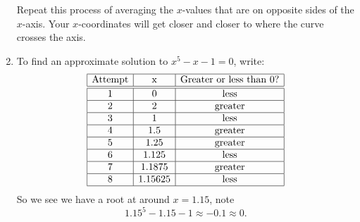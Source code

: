 \documentclass[handout,nooutcomes,noauthor]{ximera}
\begin{document}
\begin{question}
\begin{freeResponse}
\begin{enumerate}
    Repeat this process of averaging the $x$-values that are on
    opposite sides of the $x$-axis. Your $x$-coordinates will get closer
    and closer to where the curve crosses the axis.



    \item To find an approximate  solution to $x^5-x-1=0$, write:
    \[
    \begin{array}{|c|c|c|c|}\hline
      \text{Attempt} & \text{x} & \text{Greater or less than $0$?} \\ \hline\hline
      1 & 0 & \text{less} \\ \hline
      2 & 2 & \text{greater}  \\ \hline
      3 & 1 & \text{less}  \\ \hline
      4 & 1.5 & \text{greater}  \\ \hline
      5 & 1.25 & \text{greater}  \\ \hline
      6 & 1.125 & \text{less}  \\ \hline
      7 & 1.1875 & \text{greater}  \\ \hline
      8 & 1.15625 & \text{less}  \\ \hline
    \end{array}
    \]
    So we see we have a root at around $x=1.15$, note
    \[
    1.15^5 - 1.15 -1 \approx  -0.1 \approx 0.
    \]
    \end{enumerate}
  \end{freeResponse}
  
\end{question}
\mynewpage
\end{document}
